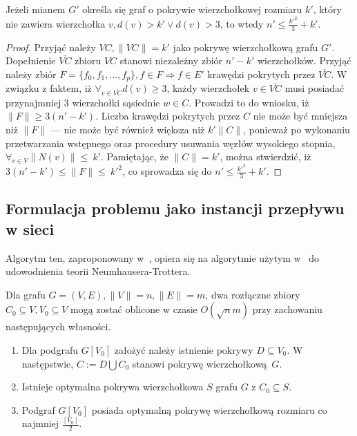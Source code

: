 \begin{theorem}
  Jeżeli mianem $G\prime$ określa się graf o pokrywie wierzchołkowej rozmiaru
  $k\prime$, który nie zawiera wierzchołka $v, d(v) > k\prime \lor d(v) > 3$, to
  wtedy $n\prime \leq \frac{k\prime^2}{3} + k\prime$.
\end{theorem}
\begin{proof}
  Przyjąć należy ${VC,\|VC\|=k\prime}$ jako pokrywę wierzchołkową grafu
  $G\prime$.
  Dopełnienie $\overline{VC}$ zbioru $VC$ stanowi niezależny zbiór
  $n\prime-k\prime$ wierzchołków.
  Przyjąć należy zbiór $F=\{f_0,f_1, \ldots, f_p\}, f \in F \Rightarrow f \in E\prime$
  krawędzi pokrytych przez $\overline{VC}$.
  W związku z faktem, iż $\forall_{v \in \overline{VC}}{d(v) \geq 3}$, każdy
  wierzchołek $v \in \overline{VC}$ musi posiadać przynajmniej 3 wierzchołki sąsiednie
  $w \in C$.
  Prowadzi to do wniosku, iż $\|F\| \geq 3(n\prime - k\prime)$.
  Liczba krawędzi pokrytych przez $C$ nie może być mniejsza niż $\|F\|$ --- nie
  może być również większa niż $k\prime\|C\|$, ponieważ po wykonaniu
  przetwarzania wstępnego oraz procedury usuwania węzłów wysokiego stopnia,
  $\forall_{v \in V}{\|N(v)\|\leq~k\prime}$.
  Pamiętając, że $\|C\|=k\prime$, można stwierdzić, iż
  ${3(n\prime-k\prime)\leq\|F\|\leq~k\prime^2}$, co sprowadza się do
  ${n\prime\leq\frac{k\prime^2}{3}+k\prime}$.
\end{proof}

\subsection{Formulacja problemu jako instancji przepływu w sieci}\label{Kernelization_network_flow}
Algorytm ten, zaproponowany w~\cite{KernelizationAlgorithms04}, opiera się na
algorytmie użytym w~\cite{Niedermeier02} do udowodnienia teorii
Neumhausera-Trottera.

\begin{nt*}
  Dla grafu $G=(V,E), \|V\|=n, \|E\|=m$, dwa rozłączne zbiory $C_0 \subseteq V,
  V_0 \subseteq V$ mogą zostać oblicone w czasie $O(\sqrt{n}m)$ przy zachowaniu
  następujących własności.
  \begin{enumerate}
    \item Dla podgrafu $G[V_0]$ założyć należy istnienie pokrywy $D \subseteq
      V_0$. W następstwie, $C := D \bigcup C_0$ stanowi pokrywę wierzchołkową~$G$.
    \item Istnieje optymalna pokrywa wierzchołkowa $S$ grafu $G$ z $C_0
      \subseteq S$.
    \item Podgraf $G[V_0]$ posiada optymalną pokrywę wierzchołkową rozmiaru co
      najmniej $\frac{[V_0]}{2}$. 
  \end{enumerate}
\end{nt*}

